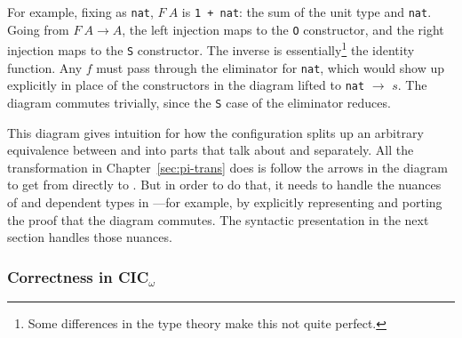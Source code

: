 For example, fixing \Aa as \lstinline{nat}, $F\ A$ is \lstinline{1 + nat}:
the sum of the unit type and \lstinline{nat}.
Going from $F\ A \rightarrow A$, the left injection maps to the \lstinline{O} constructor, and the right injection maps to the \lstinline{S} constructor.
The inverse is essentially\footnote{Some differences in the type theory make this not quite perfect.} the identity function.
Any $f$ must pass through the eliminator for \lstinline{nat}, which would show up explicitly in place of the constructors
in the diagram lifted to \lstinline{nat} $\rightarrow$ $s$.
The diagram commutes trivially, since the \lstinline{S} case of the eliminator reduces.

This diagram gives intuition for how the configuration splits up an arbitrary equivalence between \Aa and \B into
parts that talk about \Aa and \B separately. All the transformation in Chapter~\ref{sec:pi-trans} does is follow the arrows
in the diagram to get from \Aa directly to \B.
But in order to do that, it needs to handle the nuances of  and dependent types in ---for example,
by explicitly representing and porting the proof that the diagram commutes.
The syntactic presentation in the next section handles those nuances.

\subsubsection{Correctness in CIC$_{\omega}$}
\label{sec:correct-cic}

